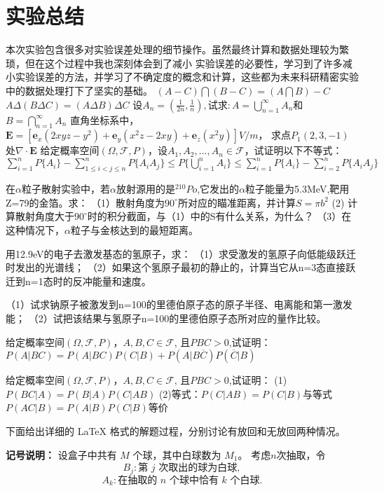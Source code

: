 \documentclass[UTF-8,twoside,cs4size]{ctexart}
\begin{document}
\section{实验总结}
本次实验包含很多对实验误差处理的细节操作。虽然最终计算和数据处理较为繁琐，但在这个过程中我也深刻体会到了减小
实验误差的必要性，学习到了许多减小实验误差的方法，并学习了不确定度的概念和计算，这些都为未来科研精密实验中的数据处理打下了坚实的基础。
$(A-C)\bigcap (B-C) = (A\bigcap B) - C$
$A\Delta (B\Delta C) = (A\Delta B)\Delta C$
设$A_n = (\frac{1}{2n}, \frac{1}{n}), 试求:A = \bigcup_{n=1}^{\infty} A_n   $和$B = \bigcap_{n=1}^{\infty}A_n $
直角坐标系中，$\mathbf{E} = [\mathbf{e}_x(2xyz-y^2)+\mathbf{e}_y(x^2z-2xy)+\mathbf{e}_z(x^2y)]V/m$，
求点$P_1(2, 3, -1)$处$\nabla \cdot \mathbf{E}$ 
给定概率空间$(\Omega, \mathcal{F} , P)$，设$A_1, A_2, ..., A_n \in \mathcal{F}$，试证明以下不等式：
$\sum_{i=1}^{n}P\{A_i\} - \sum_{1\leq i < j \leq n}^{n}P\{A_iA_j\} \leq P\{\bigcup_{i=1}^{n} A_i\} \leq \sum_{i=1}^{n}P\{A_i\} - \sum_{i=2}^{n}P\{A_iA_j\}$

在$\alpha$粒子散射实验中，若$\alpha$放射源用的是$^{210} Po$,它发出的$\alpha$粒子能量为5.3MeV,靶用Z=79的金箔。求：
（1）散射角度为$90^{\circ}$所对应的瞄准距离，并计算$S = \pi b^2$
(2) 计算散射角度大于$90^{\circ}$时的积分截面，与（1）中的S有什么关系，为什么？
（3）在这种情况下，$\alpha$粒子与金核达到的最短距离。

用12.9eV的电子去激发基态的氢原子，求：
（1）求受激发的氢原子向低能级跃迁时发出的光谱线；
（2）如果这个氢原子最初的静止的，计算当它从n=3态直接跃迁到n=1态时的反冲能量和速度。

（1）试求钠原子被激发到n=100的里德伯原子态的原子半径、电离能和第一激发能；
（2）试把该结果与氢原子n=100的里德伯原子态所对应的量作比较。

给定概率空间$(\Omega, \mathcal{F} , P)$，$A, B, C \in \mathcal{F}$, 且$P{BC}>0$,试证明：
$P(A|BC) = P(A|BC)P(C|B)+P(A|B\overline{C})P(\overline{C}|B)$

给定概率空间$(\Omega, \mathcal{F} , P)$，$A, B, C \in \mathcal{F}$, 且$P{BC}>0$,试证明：
(1)$P(BC|A)=P(B|A)P(C|AB)$
(2)等式：$P(C|AB)=P(C|B)$与等式$P(AC|B)=P(A|B)P(C|B)$等价

下面给出详细的 LaTeX 格式的解题过程，分别讨论有放回和无放回两种情况。

\bigskip

\textbf{记号说明：}  
设盒子中共有 $M$ 个球，其中白球数为 $M_1$。  
考虑$n$次抽取，令  
\[
B_j: \text{第 } j \text{ 次取出的球为白球},
\]
\[
A_k: \text{在抽取的 } n \text{ 个球中恰有 } k \text{ 个白球}.
\]
\end{document}
